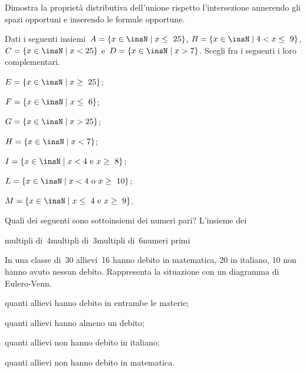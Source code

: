 \begin{esercizio}
Dimostra la proprietà distributiva dell'unione rispetto l'intersezione annerendo gli spazi opportuni
e inserendo le formule opportune.
\begin{center}
 
\end{center}
\end{esercizio}
\begin{esercizio}
Dati i seguenti insiemi~$A=\{x\in\insN\mid x\le~25\}$, $B=\{x\in\insN\mid 4<x\le~9\}$, $C=\{x\in\insN\mid x<25\}$ e~$D=\{x\in\insN\mid x>7\}$.
Scegli fra i seguenti i loro complementari.
\begin{multicols}{2}
\begin{enumeratea}
\item $E=\{x\in\insN\mid x\ge~25\}$;
\item $F=\{x\in\insN\mid x\le~6\}$;
\item $G=\{x\in\insN\mid x>25\}$;
\item $H=\{x\in\insN\mid x<7\}$;
\item $I=\{x\in\insN\mid x<4\text{ e }x\ge~8\}$;
\item $L=\{x\in\insN\mid x<4\text{ o }x\ge~10\}$;
\item $M=\{x\in\insN\mid x\le~4\text{ e }x\ge~9\}$.
\end{enumeratea}
\end{multicols}
\end{esercizio}

\begin{esercizio}
Quali dei seguenti sono sottoinsiemi dei numeri pari? L'insieme dei

\begin{center}
 \boxA\quad multipli di~4\quad\boxB\quad multipli di~3\quad\boxC\quad multipli di~6\quad\boxD\quad numeri primi
\end{center}
\end{esercizio}

\begin{esercizio}[\Ast]
In una classe di~30 allievi~16 hanno debito in matematica, 20 in
italiano, 10 non hanno avuto nessun debito. Rappresenta la situazione
con un diagramma di Eulero-Venn.

\begin{enumeratea}
\item quanti allievi hanno debito in entrambe le materie;
\item quanti allievi hanno almeno un debito;
\item quanti allievi non hanno debito in italiano;
\item quanti allievi non hanno debito in matematica.
\end{enumeratea}
\end{esercizio}

